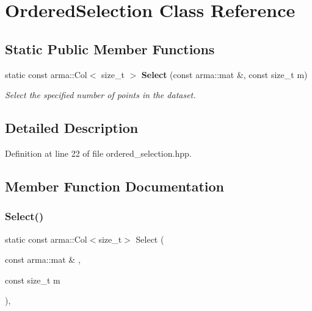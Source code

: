 \section{Ordered\+Selection Class Reference}
\label{classmlpack_1_1kernel_1_1OrderedSelection}
\subsection*{Static Public Member Functions}
\begin{DoxyCompactItemize}
\item 
static const arma\+::\+Col$<$ size\+\_\+t $>$ \textbf{ Select} (const arma\+::mat \&, const size\+\_\+t m)
\begin{DoxyCompactList}\small\item\em Select the specified number of points in the dataset. \end{DoxyCompactList}\end{DoxyCompactItemize}


\subsection{Detailed Description}


Definition at line 22 of file ordered\+\_\+selection.\+hpp.



\subsection{Member Function Documentation}
\mbox{\label{classmlpack_1_1kernel_1_1OrderedSelection_a12e96f27b338680c246f78d86d8046c2}} 
\subsubsection{Select()}
{\footnotesize\ttfamily static const arma\+::\+Col$<$size\+\_\+t$>$ Select (\begin{DoxyParamCaption}\item[{const arma\+::mat \&}]{,  }\item[{const size\+\_\+t}]{m }\end{DoxyParamCaption})\hspace{0.3cm}{\ttfamily [inline]}, {\ttfamily [static]}}



